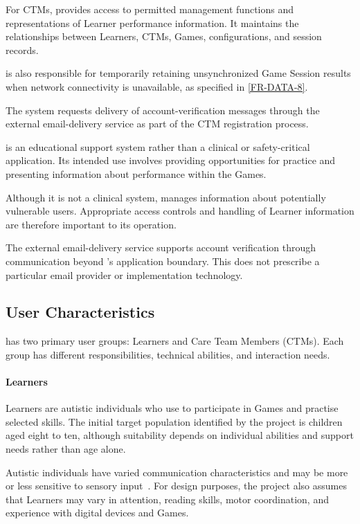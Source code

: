\documentclass[12pt]{article}
\begin{document}
For CTMs, \progname{} provides access to permitted management functions and
representations of Learner performance information. It maintains the
relationships between Learners, CTMs, Games, configurations, and session
records.

\progname{} is also responsible for temporarily retaining unsynchronized Game
Session results when network connectivity is unavailable, as specified in
\ref{FR-DATA-8}.

The system requests delivery of account-verification messages through the
external email-delivery service as part of the CTM registration process.

\progname{} is an educational support system rather than a clinical or
safety-critical application. Its intended use involves providing opportunities
for practice and presenting information about performance within the Games.

Although it is not a clinical system, \progname{} manages information about
potentially vulnerable users. Appropriate access controls and handling of
Learner information are therefore important to its operation.

The external email-delivery service supports account verification through
communication beyond \progname{}'s application boundary. This does not prescribe
a particular email provider or implementation technology.

\subsection{User Characteristics} \label{SecUserCharacteristics}

\progname{} has two primary user groups: Learners and Care Team Members (CTMs).
Each group has different responsibilities, technical abilities, and interaction
needs.

\paragraph{Learners}

Learners are autistic individuals who use \progname{} to participate in Games
and practise selected skills. The initial target population identified by the
project is children aged eight to ten, although suitability depends on individual
abilities and support needs rather than age alone.

Autistic individuals have varied communication characteristics and may be
more or less sensitive to sensory input~\citep{nimhAutism2025}. For design
purposes, the project also assumes that Learners may vary in attention, reading
skills, motor coordination, and experience with digital devices and Games.
\end{document}
